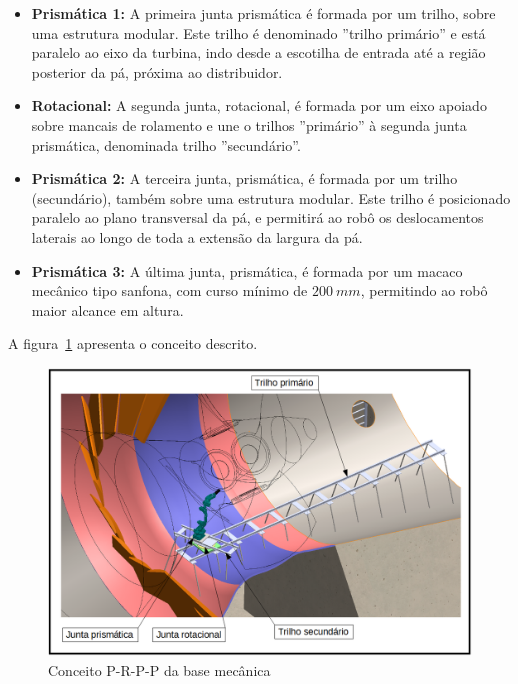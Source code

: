 \begin{itemize} 

	\item\textbf{Prismática 1:} A primeira junta prismática é formada por um
	trilho, sobre uma estrutura modular. Este trilho é denominado ''trilho
	primário'' e está paralelo ao eixo da turbina, indo desde a escotilha de
	entrada até a região posterior da pá, próxima ao distribuidor.

	\item\textbf{Rotacional:} A segunda junta, rotacional, é formada por um
	eixo apoiado sobre mancais de rolamento e une o trilhos ''primário'' à segunda
	junta prismática, denominada trilho ''secundário''.

	\item\textbf{Prismática 2:} A terceira junta,
	prismática, é formada por um trilho (secundário), também
	sobre uma estrutura modular. Este trilho é posicionado paralelo ao plano
	transversal da pá, e permitirá ao robô os deslocamentos laterais ao longo de
	toda a extensão da largura da pá. 

	\item\textbf{Prismática 3:} A última junta, prismática, é formada por um
	macaco mecânico tipo sanfona, com curso mínimo de $200~mm$, permitindo ao robô
	maior alcance em altura.
	
\end{itemize}

A figura~\ref{fig::conceito} apresenta o conceito descrito.

\begin{figure}[h!]
	\centering
	\includegraphics[width=0.9\columnwidth]{figs/conceito/conceito_P-R-P-P_01_tags}
	\caption{Conceito P-R-P-P da base mecânica}
    \label{fig::conceito}
\end{figure}


